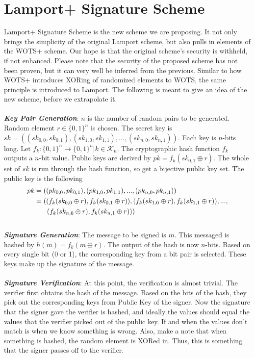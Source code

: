 \documentclass[]{scrartcl}
\makeatletter
\newcommand{\mathleft}{\@fleqntrue\@mathmargin0pt}
\makeatother
\begin{document}
\section*{Lamport+ Signature Scheme}
Lamport+ Signature Scheme is the new scheme we are proposing. It not only brings the simplicity of the original Lamport scheme, but also pulls in elements of the WOTS+ scheme. Our hope is that the original scheme's security is withheld, if not enhanced. Please note that the security of the proposed scheme has not been proven, but it can very well be inferred from the previous. Similar to how WOTS+ introduces XORing of randomized elements to WOTS, the same principle is introduced to Lamport. The following is meant to give an idea of the new scheme, before we extrapolate it.\\ \\
\textbf{\textit{Key Pair Generation}}: $n$ is the number of random pairs to be generated. Random element $r \in \{0,1\}^n$ is chosen. The secret key is $sk = ((sk_{0,0}, sk_{0,1}),(sk_{1,0}, sk_{1,1}),...,(sk_{n,0}, sk_{n,1}))$. Each key is $n$-bits long. Let $f_k : \{0,1\}^n \rightarrow \{0,1\}^n | k \in \mathcal{K}_n$. The cryptographic hash function $f_k$ outputs a $n$-bit value. Public keys are derived by $pk = f_k(sk_{0,1} \oplus r)$. The whole set of $sk$ is run through the hash function, so get a bijective public key set. The public key is the following 
\mathleft
\begin{equation}
\begin{split}
pk & = ((pk_{0,0}, pk_{0,1}),(pk_{1,0}, pk_{1,1}),...,(pk_{n,0}, pk_{n,1})) \\
& = ((f_k(sk_{0,0} \oplus r), f_k(sk_{0,1}\oplus r)),(f_k(sk_{1,0} \oplus r), f_k(sk_{1,1}\oplus r)),...,\\
& \hspace{0.65cm}(f_k(sk_{n,0} \oplus r), f_k(sk_{n,1}\oplus r)))
\end{split}
\end{equation} \\
\textbf{\textit{Signature Generation}}: The message to be signed is $m$. This messaged is hashed by $h(m) = f_k(m \oplus r)$. The output of the hash is now $n$-bits. Based on every single bit (0 or 1), the corresponding key from a bit pair is selected. These keys make up the signature of the message.\\ \\
\textbf{\textit{Signature Verification}}: At this point, the verification is almost trivial. The verifier first obtains the hash of the message. Based on the bits of the hash, they pick out the corresponding keys from Public Key of the signer. Now the signature that the signer gave the verifier is hashed, and ideally the values should equal the values that the verifier picked out of the public key. If and when the values don't match is when we know something is wrong. Also, make a note that when something is hashed, the random element is XORed in. Thus, this is something that the signer passes off to the verifier.
\end{document}
